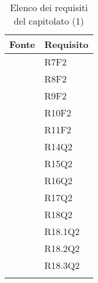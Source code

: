 		\begin{table}[H]
			\centering
			{\def\arraystretch{1.4}
			\begin{tabularx}{\textwidth}{YY}
				\textbf{Fonte} & \textbf{Requisito} \\
				\toprule
				 & R7F2 \\
				 & R8F2 \\
				 & R9F2 \\
				 & R10F2 \\ 
				 & R11F2 \\
				 & R14Q2 \\
				 & R15Q2 \\
				 & R16Q2 \\
				 & R17Q2 \\
				 & R18Q2 \\
				 & R18.1Q2 \\
				 & R18.2Q2 \\
				  & R18.3Q2 \\
				\bottomrule\\
			\end{tabularx}}
			\caption{Elenco dei requisiti del capitolato (1)}
		\end{table}
		

